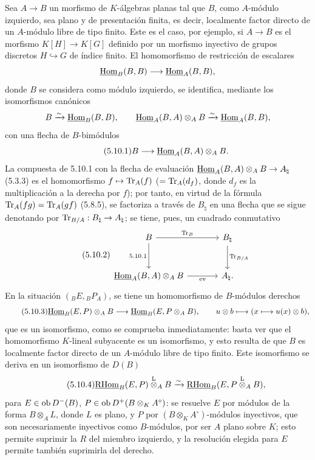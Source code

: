 Sea $A\to B$ un morfismo de $K$-álgebras planas tal que $B$, como $A$-módulo izquierdo, sea plano y de presentación finita, es decir, localmente factor directo de un $A$-módulo libre de tipo finito. Este es el caso, por ejemplo, si $A\to B$ es el morfismo $K[H]\to K[G]$ definido por un morfismo inyectivo de grupos discretos $H\hookrightarrow G$ de índice finito. El homomorfismo de restricción de escalares
\[
\underline{\operatorname{Hom}}_B(B,B)\longrightarrow\underline{\operatorname{Hom}}_A(B,B),
\]
donde $B$ se considera como módulo izquierdo, se identifica, mediante los isomorfismos canónicos
\[
B\xrightarrow{\sim}\underline{\operatorname{Hom}}_B(B,B),\qquad \underline{\operatorname{Hom}}_A(B,A)\otimes_AB\xrightarrow{\sim}\underline{\operatorname{Hom}}_A(B,B),
\]
con una flecha de $B$-bimódulos
\begin{equation}\tag{5.10.1}
B\longrightarrow\underline{\operatorname{Hom}}_A(B,A)\otimes_AB.
\end{equation}
La compuesta de 5.10.1 con la flecha de evaluación $\underline{\operatorname{Hom}}_A(B,A)\otimes_AB\to A_\natural$ (5.3.3) es el homomorfismo $f\mapsto\operatorname{Tr}_A(f)$ ($=\operatorname{Tr}_A(d_f)$, donde $d_f$ es la multiplicación a la derecha por $f$); por tanto, en virtud de la fórmula $\operatorname{Tr}_A(fg)=\operatorname{Tr}_A(gf)$ (5.8.5), se factoriza a través de $B_\natural$ en una flecha que se sigue denotando por $\operatorname{Tr}_{B/A}:B_\natural\to A_\natural$; se tiene, pues, un cuadrado conmutativo
\begin{equation}\tag{5.10.2}
\begin{tikzcd}[column sep=large,row sep=large]
B \arrow[r,"\Tr_B"] \arrow[d,"5.10.1"'] & B_\natural \arrow[d,"\Tr_{B/A}"]\\
\uHom_A(B,A)\otimes_AB \arrow[r,"\mathrm{ev}"'] & A_\natural .
\end{tikzcd}
\end{equation}
En la situación $({}_BE,{}_BP_A)$, se tiene un homomorfismo de $B$-módulos derechos
\begin{equation}\tag{5.10.3}
\underline{\operatorname{Hom}}_B(E,P)\otimes_AB\longrightarrow\underline{\operatorname{Hom}}_B(E,P\otimes_AB),\qquad
u\otimes b\longmapsto(x\longmapsto u(x)\otimes b),
\end{equation}
que es un isomorfismo, como se comprueba inmediatamente: basta ver que el homomorfismo $K$-lineal subyacente es un isomorfismo, y esto resulta de que $B$ es localmente factor directo de un $A$-módulo libre de tipo finito. Este isomorfismo se deriva en un isomorfismo de $D(B)$
\begin{equation}\tag{5.10.4}
\underline{\mathrm{RHom}}_B(E,P)\overset{\mathrm L}{\otimes}_AB\xrightarrow{\sim}\underline{\mathrm{RHom}}_B(E,P\overset{\mathrm L}{\otimes}_AB),
\end{equation}
para $E\in\operatorname{ob} D^-(B)$, $P\in\operatorname{ob} D^+(B\otimes_KA^\circ)$: se resuelve $E$ por módulos de la forma $B\otimes_AL$, donde $L$ es plano, y $P$ por $(B\otimes_KA^\circ)$-módulos inyectivos, que son necesariamente inyectivos como $B$-módulos, por ser $A$ plano sobre $K$; esto permite suprimir la $R$ del miembro izquierdo, y la resolución elegida para $E$ permite también suprimirla del derecho.
